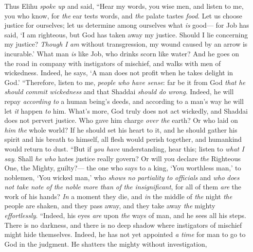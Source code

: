 \begin{biblechapter} %
 Thus Elihu \textit{spoke up} and said,
\verse “Hear my words, you wise men, 
and listen to me, you who know,
\verse for \textit{the} ear tests words, 
and \textit{the} palate tastes \textit{food}.
\verse Let us choose justice for ourselves; 
let us determine among ourselves what \textit{is} good—
\verse for Job has said, ‘I am righteous, 
but God has taken away my justice.
\verse Should I lie concerning my justice? 
\textit{Though I am} without transgression, my wound caused by an arrow is incurable.’
\verse What man \textit{is} like Job, 
who drinks scorn like water?
\verse And he goes on the road in company with instigators of mischief, 
and walks with men of wickedness.
\verse Indeed, he says, ‘A man does not profit 
when he takes delight in God.’
\verse “Therefore, listen to me, \textit{people who have sense}: 
far be it from God \textit{that he should commit wickedness} 
and that Shaddai \textit{should do wrong}.
\verse Indeed, he will repay \textit{according to} a human being’s deeds, 
and according to a man’s way he will let \textit{it} happen \textit{to} him.
\verse What’s more, God truly does not act wickedly, 
and Shaddai does not pervert justice.
\verse Who gave him charge \textit{over the} earth? 
Or who laid on \textit{him} \textit{the} whole world?
\verse If he should set his heart to it, 
and he should gather his spirit and his breath to himself,
\verse all flesh would perish together, 
and humankind would return to dust.
\verse “But if \textit{you have} understanding, hear this; 
listen to \textit{what I say}.
\verse Shall \textit{he who} hates justice really govern? 
Or will you declare \textit{the} Righteous One, the Mighty, guilty?—
\verse the one who says to a king, 
‘You worthless man,’ to noblemen, ‘You wicked man,’
\verse who \textit{shows no partiality to officials} 
and \textit{who} \textit{does not take note of the noble more than of the insignificant}, 
for all of them \textit{are} the work of his hands?
\verse \textit{In} a moment they die, 
and \textit{in} the middle of \textit{the} night \textit{the} people are shaken, and they pass away, 
and they take away \textit{the} mighty \textit{effortlessly}.
\verse “Indeed, his eyes \textit{are} upon \textit{the} ways of man, 
and he sees all his steps.
\verse There is no darkness, and there is no deep shadow 
where instigators of mischief might hide themselves.
\verse Indeed, he has not yet appointed \textit{a time} for man 
to go to God in the judgment.
\verse He shatters the mighty without investigation, 

\end{biblechapter}
